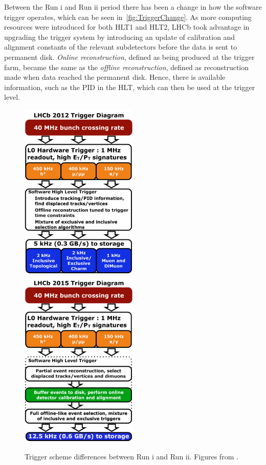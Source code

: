Between the Run \Rn{1} and Run \Rn{2} period there has been a change in how the software trigger operates, which can be seen in~\autoref{fig:TriggerChange}. As more computing resources were introduced for both \Gls{HLT1} and \Gls{HLT2}, \Gls{LHCb} took advantage in upgrading the trigger system by introducing an update of \DIFaddbegin {}\DIFaddend calibration and alignment constants of the relevant subdetectors before the data is sent to permanent disk. \textit{Online reconstruction}, defined as being produced at the trigger farm, became the same as the \textit{offline reconstruction}, defined as reconstruction made when data reached the permanent disk. Hence, there is \DIFdelbegin {}\DIFdelend \DIFaddbegin {}\DIFaddend available information, such as the \Gls{PID} in the \Gls{HLT}, which can then be used at the trigger level. 


\begin{figure}[!h]
	\centering
	\includegraphics[width = 0.5\textwidth]{figs/detector/LHCb_Trigger_RunIAlg.pdf}%
	\includegraphics[width = 0.5\textwidth]{figs/detector/LHCb_Trigger_RunII.pdf}%
	\caption{Trigger scheme differences between Run \Rn{1} and Run \Rn{2}. Figures from \cite{triggerscheme}.}  
	\label{fig:TriggerChange}
\end{figure}


